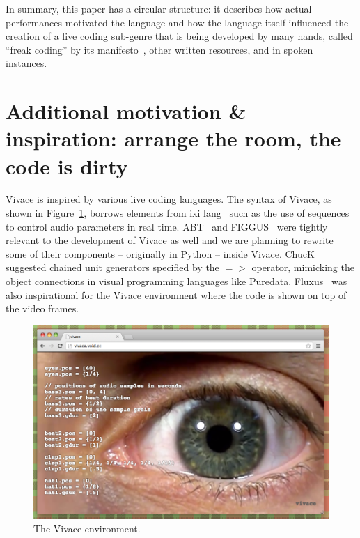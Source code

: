 \documentclass[letterpaper, 12pt]{article}
\begin{document}
{In summary, this paper has a circular structure: it describes how
actual performances motivated the language and how the language itself
influenced the creation of a live coding sub-genre that is being
developed by many hands, called ``freak coding'' by its
manifesto~\citep{freak}, other written resources, and in spoken
instances.

\parskip 18pt

\section{Additional motivation \& inspiration: arrange the room, the code is dirty}

Vivace is inspired by various live coding languages. The syntax of
Vivace, as shown in Figure~\ref{fig:vivace}, borrows elements from ixi
lang~\citep{magnusson2011ixi} such as the use of sequences to control
audio parameters in real time. ABT~\citep{fabbri} and
FIGGUS~\citep{fabbri2} were tightly relevant to the development of
Vivace as well and we are planning to rewrite some of their components
-- originally in Python -- inside Vivace. ChucK suggested chained unit
generators specified by the $=>$ operator, mimicking the object
connections in visual programming languages like
Puredata. Fluxus~\citep{fluxus} was also inspirational for the Vivace
environment where the code is shown on top of the video frames.

\begin{figure}[htpb]
  \begin{center}
    \includegraphics[scale=.4]{img/fig_vivace.png}
    \caption{The Vivace environment.}
    \label{fig:vivace}
  \end{center}
\end{figure}

}
\end{document}
